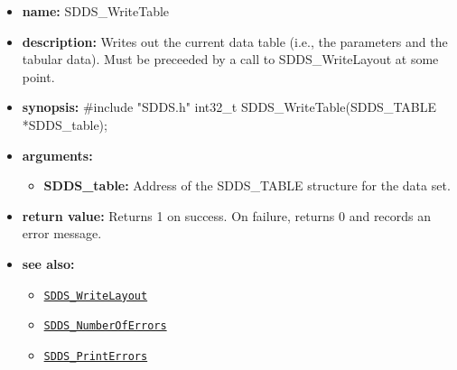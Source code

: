 \documentclass[11pt]{article}
\newcommand{\progref}[1]{\hyperref[SDDS_#1]{\tt SDDS\_#1}}
\begin{document}
\begin{itemize}
\item {\bf name:}\newline
SDDS\_WriteTable
\item {\bf description:}\newline
Writes out the current data table (i.e., the parameters and the tabular data). Must be preceeded by a call to SDDS\_WriteLayout at some point.
\item {\bf synopsis:} \#include "SDDS.h"\newline
int32\_t SDDS\_WriteTable(SDDS\_TABLE *SDDS\_table);
\item {\bf arguments:}
\begin{itemize}
\item {\bf SDDS\_table:} Address of the SDDS\_TABLE structure for the data set.
\end{itemize}
\item {\bf return value:}\newline
Returns 1 on success. On failure, returns 0 and records an error message.
\item {\bf see also:}
\begin{itemize}
\item \progref{WriteLayout}
\item \progref{NumberOfErrors}
\item \progref{PrintErrors}
\end{itemize}
\end{itemize}

\tableofcontents
\end{document}
